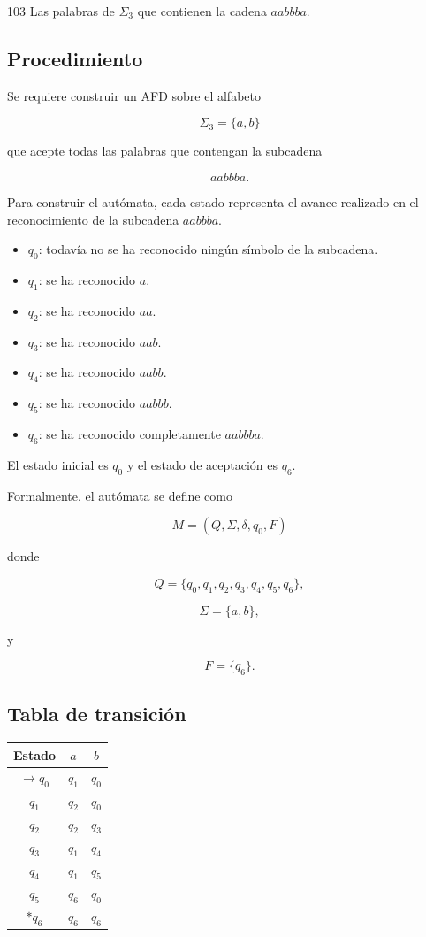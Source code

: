 \documentclass[12pt]{article}
\begin{document}
\begin{enunciado}{103}
Las palabras de $\Sigma_3$ que contienen la cadena $aabbba$.
\end{enunciado}
\subsection*{Procedimiento}

Se requiere construir un AFD sobre el alfabeto

\[
\Sigma_3=\{a,b\}
\]

que acepte todas las palabras que contengan la subcadena

\[
aabbba.
\]

Para construir el autómata, cada estado representa el avance realizado
en el reconocimiento de la subcadena $aabbba$.

\begin{itemize}
    \item $q_0$: todavía no se ha reconocido ningún símbolo de la subcadena.
    \item $q_1$: se ha reconocido $a$.
    \item $q_2$: se ha reconocido $aa$.
    \item $q_3$: se ha reconocido $aab$.
    \item $q_4$: se ha reconocido $aabb$.
    \item $q_5$: se ha reconocido $aabbb$.
    \item $q_6$: se ha reconocido completamente $aabbba$.
\end{itemize}

El estado inicial es $q_0$ y el estado de aceptación es $q_6$.

Formalmente, el autómata se define como

\[
M=(Q,\Sigma,\delta,q_0,F)
\]

donde

\[
Q=\{q_0,q_1,q_2,q_3,q_4,q_5,q_6\},
\]

\[
\Sigma=\{a,b\},
\]

y

\[
F=\{q_6\}.
\]

\subsection*{Tabla de transición}

\begin{center}
\begin{tabular}{c|cc}
Estado & $a$ & $b$ \\ \hline
$\rightarrow q_0$ & $q_1$ & $q_0$ \\
$q_1$ & $q_2$ & $q_0$ \\
$q_2$ & $q_2$ & $q_3$ \\
$q_3$ & $q_1$ & $q_4$ \\
$q_4$ & $q_1$ & $q_5$ \\
$q_5$ & $q_6$ & $q_0$ \\
$*q_6$ & $q_6$ & $q_6$
\end{tabular}
\end{center}
\end{document}
